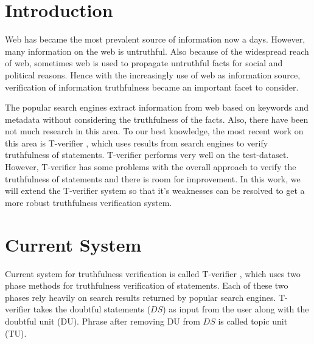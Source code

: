 \documentclass[12pt]{article}
\begin{document}


\section{Introduction}
Web has became the most prevalent source of information now a days. However, many
information on the web is untruthful. Also because of the widespread reach of
web, sometimes web is used to propagate untruthful facts for social and political
reasons. Hence with the increasingly use of web as information source,
verification of information truthfulness became an important facet to consider.

The popular search engines extract information from web based on keywords and
metadata without considering the truthfulness of the facts. Also, there have been
not much research in this area. To our best knowledge, the most recent work on this area is T-verifier  \cite{tverifier}, which uses results from search engines
to verify truthfulness of statements. T-verifier performs very well on the
test-dataset. However, T-verifier has some problems with the overall approach to
verify the truthfulness of statements and there is room for improvement. In this
work, we will extend the T-verifier system so that it's weaknesses can be
resolved to get a more robust truthfulness verification system.


\section{Current System}
Current system for truthfulness verification is called T-verifier
\cite{tverifier}, which uses two phase methods for truthfulness verification of
statements. Each of these two phases rely heavily on search results returned by
popular search engines. T-verifier takes the doubtful statements ($DS$) as input
from the user along with the doubtful unit (DU). Phrase after removing DU from $DS$
is called topic unit (TU).
\end{document}
